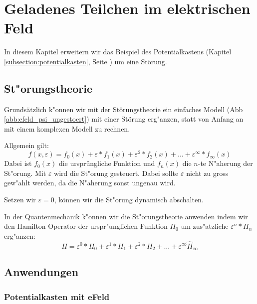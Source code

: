 \chapter{Geladenes Teilchen im elektrischen Feld\label{chapter:efeld}}
\begin{refsection}


In diesem Kapitel erweitern wir das Beispiel des Potentialkastens 
(Kapitel \ref{subsection:potentialkasten}, Seite \pageref{subsection:potentialkasten})
um eine St\"orung.

\section{ St"orungstheorie }
Grundsätzlich k"onnen wir mit der St\"orungstheorie ein einfaches Modell (Abb \ref{abb:efeld_psi_ungestoert}) mit einer St\"orung erg"anzen, statt von Anfang an mit einem komplexen Modell zu rechnen.

Allgemein gilt:
\[
  f(x, \varepsilon) = f_0(x) + \varepsilon*f_1(x) + \varepsilon^2*f_2(x) + \ldots + \varepsilon^\infty*f_\infty(x)
\]
Dabei ist $f_0(x)$ die urspr\"ungliche Funktion und $f_n(x)$ die $n$-te  N"aherung der St"orung.
Mit $\varepsilon$ wird die St"orung gesteuert. Dabei sollte $\varepsilon$ nicht zu gross gew"ahlt werden, 
da die N"aherung sonst ungenau wird. 

Setzen wir $\varepsilon = 0$, k\"onnen wir die St"orung dynamisch abschalten.

In der Quantenmechanik k"onnen wir die St"orungstheorie anwenden indem wir den Hamilton-Operator der urspr"unglichen Funktion $H_0$ um zus"atzliche $\varepsilon^n*H_n$ erg"anzen:
\[
  H = \varepsilon^0*H_0 + \varepsilon^1*H_1 + \varepsilon^2*H_2 + \ldots + \varepsilon^\infty \hat H_\infty
\]












\section{ Anwendungen }

\subsection{ Potentialkasten mit eFeld }



\end{refsection}
